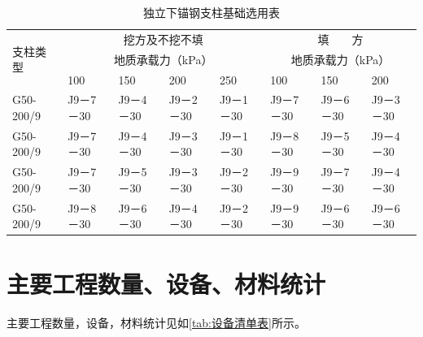 \begin{longtable}[c]{|p{1.5cm}|p{1cm}|p{1cm}|p{1cm}|p{1cm}|p{1cm}|p{1cm}|p{1cm}|}
	\caption{独立下锚钢支柱基础选用表}
	\label{tab:独立下锚钢支柱基础选用表}\\
	\hline
	\multirow{3}{*}{支柱类型} & \multicolumn{4}{c|}{挖方及不挖不填}                                                                         & \multicolumn{3}{c|}{填　　方}                                             \\ \cline{2-8} 
	& \multicolumn{4}{c|}{地质承载力（kPa）}                                                                      & \multicolumn{3}{c|}{地质承载力（kPa）}                                       \\ \cline{2-8} 
	& \multicolumn{1}{p{1cm}|}{100}     & \multicolumn{1}{p{1cm}|}{150}     & \multicolumn{1}{p{1cm}|}{200}     & 250     & \multicolumn{1}{p{1cm}|}{100}     & \multicolumn{1}{p{1cm}|}{150}     & 200     \\ \hline
	\endfirsthead
	\endhead
	G50-200/9             & \multicolumn{1}{p{1cm}|}{J9－7－30} & \multicolumn{1}{p{1cm}|}{J9－4－30} & \multicolumn{1}{p{1cm}|}{J9－2－30} & J9－1－30 & \multicolumn{1}{p{1cm}|}{J9－7－30} & \multicolumn{1}{p{1cm}|}{J9－6－30} & J9－3－30 \\ \hline
	G50-200/9             & \multicolumn{1}{p{1cm}|}{J9－7－30} & \multicolumn{1}{p{1cm}|}{J9－4－30} & \multicolumn{1}{p{1cm}|}{J9－3－30} & J9－1－30 & \multicolumn{1}{p{1cm}|}{J9－8－30} & \multicolumn{1}{p{1cm}|}{J9－5－30} & J9－4－30 \\ \hline
	G50-200/9             & \multicolumn{1}{p{1cm}|}{J9－7－30} & \multicolumn{1}{p{1cm}|}{J9－5－30} & \multicolumn{1}{p{1cm}|}{J9－3－30} & J9－2－30 & \multicolumn{1}{p{1cm}|}{J9－9－30} & \multicolumn{1}{p{1cm}|}{J9－7－30} & J9－4－30 \\ \hline
	G50-200/9             & \multicolumn{1}{p{1cm}|}{J9－8－30} & \multicolumn{1}{p{1cm}|}{J9－6－30} & \multicolumn{1}{p{1cm}|}{J9－4－30} & J9－2－30 & \multicolumn{1}{p{1cm}|}{J9－9－30} & \multicolumn{1}{p{1cm}|}{J9－6－30} & J9－6－30 \\ \hline
\end{longtable}

\section{主要工程数量、设备、材料统计}
主要工程数量，设备，材料统计见如\ref{tab:设备清单表}所示。

